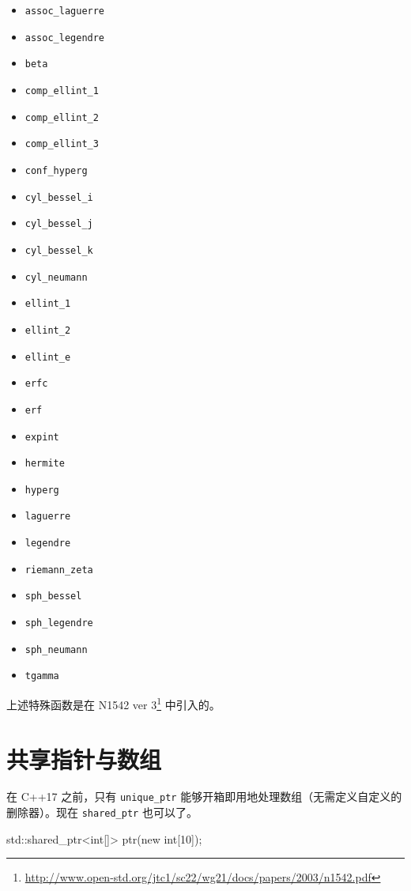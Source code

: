 \begin{itemize}
\item \texttt{assoc\_laguerre}
\item \texttt{assoc\_legendre}
\item \texttt{beta}
\item \texttt{comp\_ellint\_1}
\item \texttt{comp\_ellint\_2}
\item \texttt{comp\_ellint\_3}
\item \texttt{conf\_hyperg}
\item \texttt{cyl\_bessel\_i}
\item \texttt{cyl\_bessel\_j}
\item \texttt{cyl\_bessel\_k}
\item \texttt{cyl\_neumann}
\item \texttt{ellint\_1}
\item \texttt{ellint\_2}
\item \texttt{ellint\_e}
\item \texttt{erfc}
\item \texttt{erf}
\item \texttt{expint}
\item \texttt{hermite}
\item \texttt{hyperg}
\item \texttt{laguerre}
\item \texttt{legendre}
\item \texttt{riemann\_zeta}
\item \texttt{sph\_bessel}
\item \texttt{sph\_legendre}
\item \texttt{sph\_neumann}
\item \texttt{tgamma}
\end{itemize}

上述特殊函数是在 N1542 ver 3\footnote{\url{http://www.open-std.org/jtc1/sc22/wg21/docs/papers/2003/n1542.pdf}} 中引入的。


\section{共享指针与数组}

在 C++17 之前，只有 \texttt{unique\_ptr} 能够开箱即用地处理数组（无需定义自定义的删除器）。现在 \texttt{shared\_ptr} 也可以了。

\begin{codebox}[cpp]
std::shared_ptr<int[]> ptr(new int[10]);
\end{codebox}

